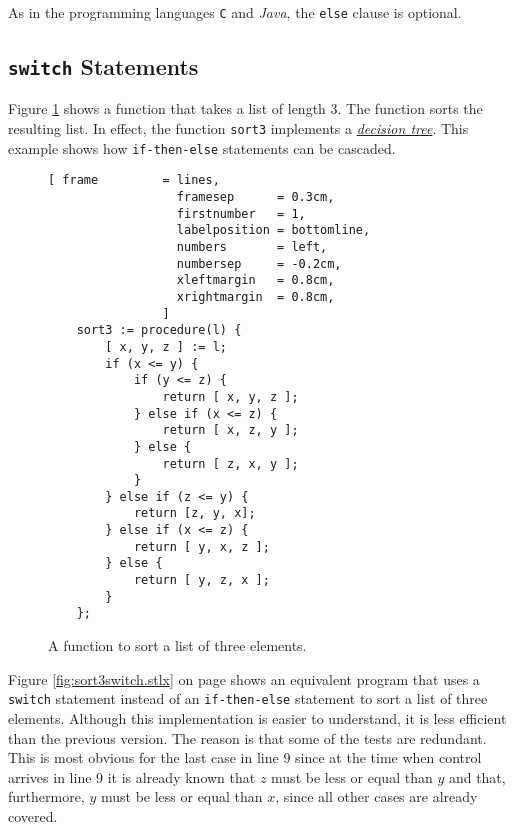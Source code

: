 As in the programming languages \texttt{C} and \textsl{Java}, the
\texttt{else} clause is optional.

\subsection{\texttt{switch} Statements}
Figure \ref{fig:sort3.stlx} shows a function that takes a list of length 3.  The function sorts
the resulting list.  In effect, the function \texttt{sort3} implements a 
\href{http://en.wikipedia.org/wiki/Decision_tree}{\emph{decision tree}}.
This example shows how \texttt{if-then-else} statements can be cascaded.

\begin{figure}[!ht]
\centering
\begin{Verbatim}[ frame         = lines, 
                  framesep      = 0.3cm, 
                  firstnumber   = 1,
                  labelposition = bottomline,
                  numbers       = left,
                  numbersep     = -0.2cm,
                  xleftmargin   = 0.8cm,
                  xrightmargin  = 0.8cm,
                ]
    sort3 := procedure(l) {
        [ x, y, z ] := l;
        if (x <= y) {
            if (y <= z) {
                return [ x, y, z ];
            } else if (x <= z) { 
                return [ x, z, y ];
            } else {
                return [ z, x, y ];
            }
        } else if (z <= y) { 
            return [z, y, x];
        } else if (x <= z) { 
            return [ y, x, z ];
        } else {
            return [ y, z, x ];
        }
    };
\end{Verbatim}
\vspace*{-0.3cm}
\caption{A function to sort a list of three elements.}
\label{fig:sort3.stlx}
\end{figure}

Figure \ref{fig:sort3switch.stlx} on page \pageref{fig:sort3switch.stlx} 
shows an equivalent program that uses a \texttt{switch} statement instead of an
\texttt{if-then-else} statement to sort a list of three elements.  Although this implementation is
easier to understand, it is less efficient than the 
previous version.  The reason is that some of the tests are redundant.  This is most obvious for the
last case in line 9 since at the time when control arrives in line 9 it is already known that $z$ must be
less or equal than $y$ and that, furthermore, $y$ must be less or equal than $x$, since all other
cases are already covered.


